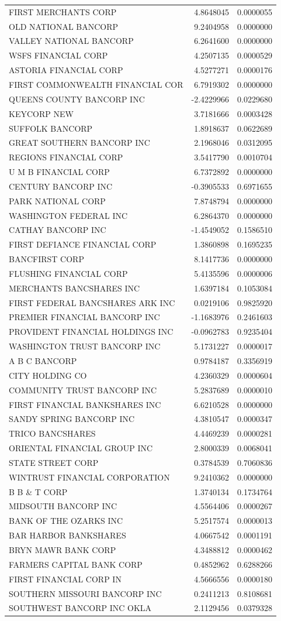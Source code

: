 \documentclass[11pt,]{article}
\begin{document}
\begin{longtable}[]{@{}lrr@{}}
FIRST MERCHANTS CORP & 4.8648045 & 0.0000055\tabularnewline
OLD NATIONAL BANCORP & 9.2404958 & 0.0000000\tabularnewline
VALLEY NATIONAL BANCORP & 6.2641600 & 0.0000000\tabularnewline
WSFS FINANCIAL CORP & 4.2507135 & 0.0000529\tabularnewline
ASTORIA FINANCIAL CORP & 4.5277271 & 0.0000176\tabularnewline
FIRST COMMONWEALTH FINANCIAL COR & 6.7919302 & 0.0000000\tabularnewline
QUEENS COUNTY BANCORP INC & -2.4229966 & 0.0229680\tabularnewline
KEYCORP NEW & 3.7181666 & 0.0003428\tabularnewline
SUFFOLK BANCORP & 1.8918637 & 0.0622689\tabularnewline
GREAT SOUTHERN BANCORP INC & 2.1968046 & 0.0312095\tabularnewline
REGIONS FINANCIAL CORP & 3.5417790 & 0.0010704\tabularnewline
U M B FINANCIAL CORP & 6.7372892 & 0.0000000\tabularnewline
CENTURY BANCORP INC & -0.3905533 & 0.6971655\tabularnewline
PARK NATIONAL CORP & 7.8748794 & 0.0000000\tabularnewline
WASHINGTON FEDERAL INC & 6.2864370 & 0.0000000\tabularnewline
CATHAY BANCORP INC & -1.4549052 & 0.1586510\tabularnewline
FIRST DEFIANCE FINANCIAL CORP & 1.3860898 & 0.1695235\tabularnewline
BANCFIRST CORP & 8.1417736 & 0.0000000\tabularnewline
FLUSHING FINANCIAL CORP & 5.4135596 & 0.0000006\tabularnewline
MERCHANTS BANCSHARES INC & 1.6397184 & 0.1053084\tabularnewline
FIRST FEDERAL BANCSHARES ARK INC & 0.0219106 & 0.9825920\tabularnewline
PREMIER FINANCIAL BANCORP INC & -1.1683976 & 0.2461603\tabularnewline
PROVIDENT FINANCIAL HOLDINGS INC & -0.0962783 & 0.9235404\tabularnewline
WASHINGTON TRUST BANCORP INC & 5.1731227 & 0.0000017\tabularnewline
A B C BANCORP & 0.9784187 & 0.3356919\tabularnewline
CITY HOLDING CO & 4.2360329 & 0.0000604\tabularnewline
COMMUNITY TRUST BANCORP INC & 5.2837689 & 0.0000010\tabularnewline
FIRST FINANCIAL BANKSHARES INC & 6.6210528 & 0.0000000\tabularnewline
SANDY SPRING BANCORP INC & 4.3810547 & 0.0000347\tabularnewline
TRICO BANCSHARES & 4.4469239 & 0.0000281\tabularnewline
ORIENTAL FINANCIAL GROUP INC & 2.8000339 & 0.0068041\tabularnewline
STATE STREET CORP & 0.3784539 & 0.7060836\tabularnewline
WINTRUST FINANCIAL CORPORATION & 9.2410362 & 0.0000000\tabularnewline
B B \& T CORP & 1.3740134 & 0.1734764\tabularnewline
MIDSOUTH BANCORP INC & 4.5564406 & 0.0000267\tabularnewline
BANK OF THE OZARKS INC & 5.2517574 & 0.0000013\tabularnewline
BAR HARBOR BANKSHARES & 4.0667542 & 0.0001191\tabularnewline
BRYN MAWR BANK CORP & 4.3488812 & 0.0000462\tabularnewline
FARMERS CAPITAL BANK CORP & 0.4852962 & 0.6288266\tabularnewline
FIRST FINANCIAL CORP IN & 4.5666556 & 0.0000180\tabularnewline
SOUTHERN MISSOURI BANCORP INC & 0.2411213 & 0.8108681\tabularnewline
SOUTHWEST BANCORP INC OKLA & 2.1129456 & 0.0379328\tabularnewline

\end{longtable}
\end{document}
